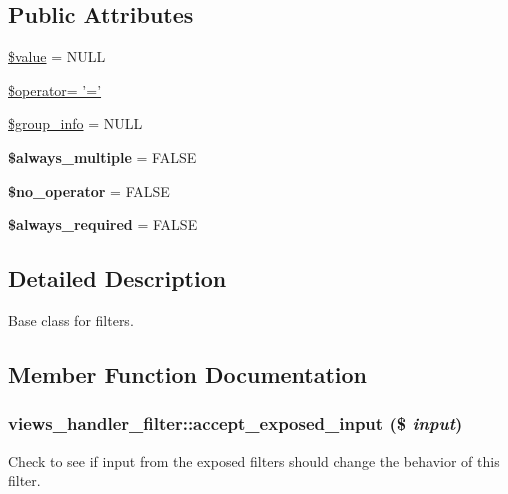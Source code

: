\subsection*{Public Attributes}
\begin{DoxyCompactItemize}
\item 
\hyperlink{classviews__handler__filter_ad5f0b79d107bf9647e7519ac75e1c027}{\$value} = NULL
\item 
\hyperlink{classviews__handler__filter_af5712859dc7461dddc7ff84faf5d8006}{\$operator= '='}
\item 
\hyperlink{classviews__handler__filter_a0a4a6d9bb1f21fc42e93ddcd22c5b8f0}{\$group\_\-info} = NULL
\item 
\hypertarget{classviews__handler__filter_af9bc03be66463803e98c1d31afb8f4ff}{
{\bfseries \$always\_\-multiple} = FALSE}
\label{classviews__handler__filter_af9bc03be66463803e98c1d31afb8f4ff}

\item 
\hypertarget{classviews__handler__filter_a516625695bb90383dfc339223c0b32bd}{
{\bfseries \$no\_\-operator} = FALSE}
\label{classviews__handler__filter_a516625695bb90383dfc339223c0b32bd}

\item 
\hypertarget{classviews__handler__filter_a84c65d18a4cc0e164492f289db98b265}{
{\bfseries \$always\_\-required} = FALSE}
\label{classviews__handler__filter_a84c65d18a4cc0e164492f289db98b265}

\end{DoxyCompactItemize}


\subsection{Detailed Description}
Base class for filters. 

\subsection{Member Function Documentation}
\hypertarget{classviews__handler__filter_a88ccd2ef359009614abb48fb83c2a738}{
\subsubsection[{accept\_\-exposed\_\-input}]{\setlength{\rightskip}{0pt plus 5cm}views\_\-handler\_\-filter::accept\_\-exposed\_\-input (\$ {\em input})}}
\label{classviews__handler__filter_a88ccd2ef359009614abb48fb83c2a738}
Check to see if input from the exposed filters should change the behavior of this filter. 

